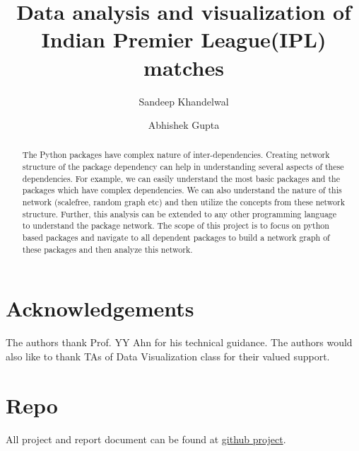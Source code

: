 \documentclass[sigconf]{acmart}
\begin{document}
\title{Data analysis and visualization of Indian Premier League(IPL) matches}

\author{Sandeep Khandelwal}

\author{Abhishek Gupta}

\begin{abstract}

The Python packages have complex nature of inter-dependencies. Creating
network structure of the package dependency can help in understanding several
 aspects of these dependencies. For example, we can easily understand the
 most basic packages and the packages which have complex dependencies. We can
  also understand the nature of this network (scalefree, random graph etc)
  and then utilize the concepts from these network structure.  Further,
this analysis can be extended to any other programming language to understand
the package network. The scope of this project is to focus on python based
packages and navigate to all dependent packages to build a network graph of
these packages and then analyze this network.
\end{abstract}


\maketitle



%

%



\section{Acknowledgements}
 The authors thank Prof. YY Ahn for his technical guidance. The
 authors would also like to thank TAs of Data Visualization class for their valued
 support. 

\section{Repo} 
 All project and report document can be found at \href{https://github.com/abhishek8gupta/dviz-project-summer2018/master/report/main.pdf}{github project}.

\nocite{*}


\end{document}
